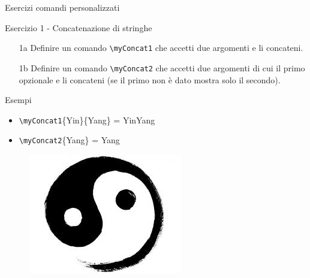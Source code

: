 \begin{frame}[fragile]{Esercizi comandi personalizzati}

\begin{block}{Esercizio 1 - Concatenazione di stringhe}
    
    \begin{itemize}
        \item [1a] Definire un comando \texttt{\textbackslash myConcat1} che accetti due argomenti e li concateni.
        \item [1b] Definire un comando \texttt{\textbackslash myConcat2} che accetti due argomenti di cui il primo opzionale e li concateni (se il primo non è dato mostra solo il secondo).
    \end{itemize}

\end{block}

\begin{block}{Esempi}

    \begin{itemize}
        \item \texttt{\textbackslash myConcat1}\{Yin\}\{Yang\} = YinYang
        \item \texttt{\textbackslash myConcat2}\{Yang\} = Yang
    \end{itemize}

\end{block}

\begin{figure}[l]
    \includegraphics[scale=0.15, left]{res/images/yinyang.jpg}
\end{figure}


\end{frame}
